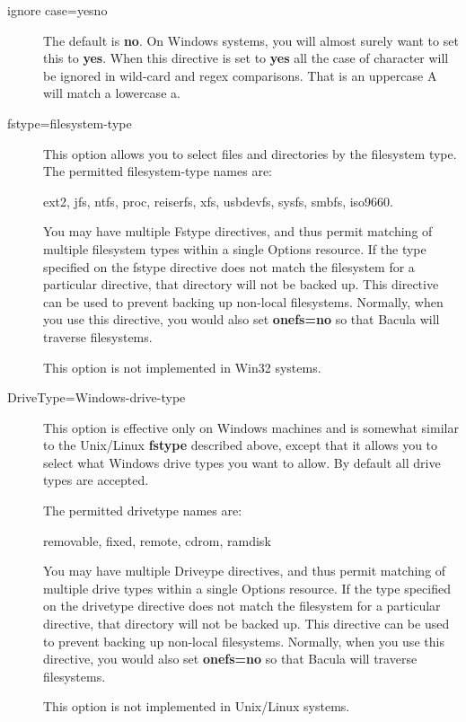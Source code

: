 \begin{description}
\item [ignore case=yes\vb{}no]
   The default is {\bf no}.  On Windows systems, you will almost surely
   want to set this to {\bf yes}.  When this directive is set to {\bf yes}
   all the case of character will be ignored in wild-card and regex
   comparisons.  That is an uppercase A will match a lowercase a.

\item [fstype=filesystem-type]
   This option allows you to select files and directories by the
   filesystem type.  The permitted filesystem-type names are:

   ext2, jfs, ntfs, proc, reiserfs, xfs, usbdevfs, sysfs, smbfs,
   iso9660.

   You may have multiple Fstype directives, and thus permit matching
   of multiple filesystem types within a single Options resource.  If
   the type specified on the fstype directive does not match the
   filesystem for a particular directive, that directory will not be
   backed up.  This directive can be used to prevent backing up
   non-local filesystems. Normally, when you use this directive, you
   would also set {\bf onefs=no} so that Bacula will traverse filesystems.

   This option is not implemented in Win32 systems.

\item [DriveType=Windows-drive-type]
   This option is effective only on Windows machines and is
   somewhat similar to the Unix/Linux {\bf fstype} described
   above, except that it allows you to select what Windows
   drive types you want to allow.  By default all drive
   types are accepted.

   The permitted drivetype names are:

   removable, fixed, remote, cdrom, ramdisk

   You may have multiple Driveype directives, and thus permit matching
   of multiple drive types within a single Options resource.  If
   the type specified on the drivetype directive does not match the
   filesystem for a particular directive, that directory will not be
   backed up.  This directive can be used to prevent backing up
   non-local filesystems. Normally, when you use this directive, you
   would also set {\bf onefs=no} so that Bacula will traverse filesystems.

   This option is not implemented in Unix/Linux systems.



\end{description}
